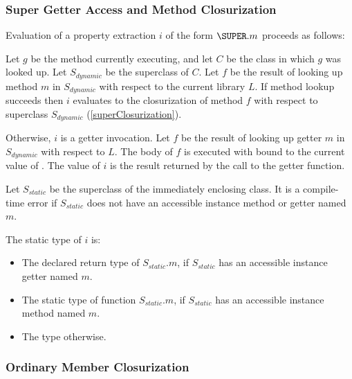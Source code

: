 \documentclass[makeidx]{article}
\begin{document}
\subsubsection{Super Getter Access and Method Closurization}

\LMHash{}%
Evaluation of a property extraction $i$ of the form $\SUPER.m$ proceeds as follows:

\LMHash{}%
Let $g$ be the method currently executing, and let $C$ be the class in which $g$ was looked up.
Let $S_{dynamic}$ be the superclass of $C$.
Let $f$ be the result of looking up method $m$ in $S_{dynamic}$ with respect to the current library $L$.
If method lookup succeeds then $i$ evaluates to the closurization of method $f$ with respect to superclass $S_{dynamic}$ (\ref{superClosurization}).

\LMHash{}%
Otherwise, $i$ is a getter invocation.
Let $f$ be the result of looking up getter $m$ in $S_{dynamic}$ with respect to $L$.
The body of $f$ is executed with \THIS{} bound to the current value of \THIS{}.
The value of $i$ is the result returned by the call to the getter function.


\LMHash{}%
Let $S_{static}$ be the superclass of the immediately enclosing class.
It is a compile-time error if $S_{static}$ does not have an accessible instance method or getter named $m$.

The static type of $i$ is:
\begin{itemize}
\item The declared return type of $S_{static}.m$, if $S_{static}$ has an accessible instance getter named $m$.
\item The static type of function $S_{static}.m$, if $S_{static}$ has an accessible instance method named $m$.
\item The type \DYNAMIC{} otherwise.
\end{itemize}


\subsubsection{Ordinary Member Closurization}

\end{document}
